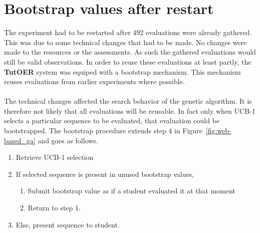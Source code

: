 \section{Bootstrap values after restart}
The experiment had to be restarted after 492 evaluations were already gathered.
This was due to some technical changes that had to be made. No changes were
made to the resources or the assessments. As such the gathered evaluations
would still be valid observations. In order to reuse these evaluations at least
partly, the \textbf{TutOER} system was equiped with a bootstrap mechanism. This
mechanism reuses evaluations from earlier experiments where possible.\\\\
\noindent
The technical changes affected the search behavior of the genetic algorithm.
It is therefore not likely that all evaluations will be reusable. In fact only
when UCB-1 selects a particular sequence to be evaluated, that evaluation could
be bootstrapped. The bootstrap procedure extends step 4 in
Figure~\ref{fig:web-based_ga} and goes as follows.
\begin{enumerate}
	\item Retrieve UCB-1 selection
	\item If selected sequence is present in unused bootstrap values,
		\begin{enumerate}
			\item Submit bootstrap value as if a student evaluated it at that moment
			\item Return to step 1.
		\end{enumerate}
	\item Else, present sequence to student.
\end{enumerate}
